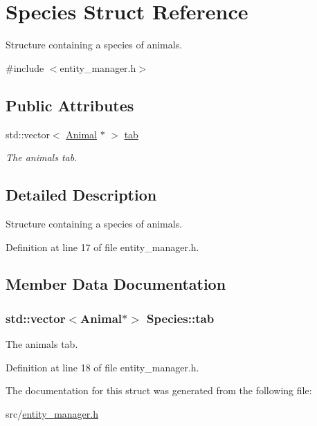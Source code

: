 \hypertarget{struct_species}{\section{Species Struct Reference}
\label{struct_species}
}


Structure containing a species of animals.  




{\ttfamily \#include $<$entity\-\_\-manager.\-h$>$}

\subsection*{Public Attributes}
\begin{DoxyCompactItemize}
\item 
std\-::vector$<$ \hyperlink{class_animal}{Animal} $\ast$ $>$ \hyperlink{struct_species_ad608dc238745c2120e642fe5222d0afb}{tab}
\begin{DoxyCompactList}\small\item\em The animals tab. \end{DoxyCompactList}\end{DoxyCompactItemize}


\subsection{Detailed Description}
Structure containing a species of animals. 

Definition at line 17 of file entity\-\_\-manager.\-h.



\subsection{Member Data Documentation}
\hypertarget{struct_species_ad608dc238745c2120e642fe5222d0afb}{
\subsubsection[{tab}]{\setlength{\rightskip}{0pt plus 5cm}std\-::vector$<${\bf Animal}$\ast$$>$ Species\-::tab}}\label{struct_species_ad608dc238745c2120e642fe5222d0afb}


The animals tab. 



Definition at line 18 of file entity\-\_\-manager.\-h.



The documentation for this struct was generated from the following file\-:\begin{DoxyCompactItemize}
\item 
src/\hyperlink{entity__manager_8h}{entity\-\_\-manager.\-h}\end{DoxyCompactItemize}
